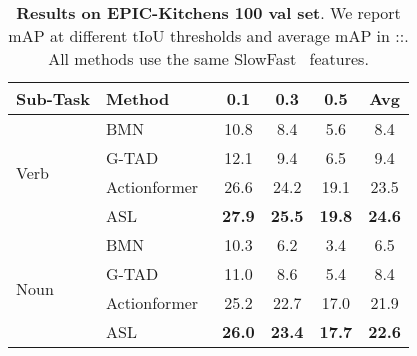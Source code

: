 \documentclass[10pt,twocolumn,letterpaper]{article}
\begin{document}
\begin{table}[t]
    \centering
    \caption{\label{tab:result_epickitchens} \textbf{Results on EPIC-Kitchens 100 val set}. We report mAP at different tIoU thresholds and average mAP in ::. All methods use the same SlowFast~\cite{slowfast,Damen2022RESCALING} features. }
    \vspace{0.5em}
    \small{
	\setlength{\tabcolsep}{2.5pt}
	\begin{tabular}{l|l|cccc}
        \toprule
	{Sub-Task} & {Method} & 0.1 &0.3 &  0.5 & Avg\\
		\hline
	\multirow{4}{*}{Verb} & BMN~\cite{lin2019bmn} & 10.8	&8.4 &5.6&8.4 \\
	& G-TAD~\cite{xu2020gtad} & 12.1 &  9.4 &  6.5 & 9.4\\
	& Actionformer~\cite{zhang2022actionformer} & 26.6 & 24.2  & 19.1 & 23.5 \\
        & ASL & \textbf{27.9} & \textbf{25.5} & \textbf{19.8} & \textbf{24.6} \\
	\hline
	\multirow{4}{*}{Noun} & BMN~\cite{lin2019bmn} & 10.3	&6.2&3.4&6.5 \\
	& G-TAD~\cite{xu2020gtad} & 11.0  & 8.6  & 5.4 & 8.4\\
	& Actionformer~\cite{zhang2022actionformer} & 25.2  & 22.7  & 17.0 & 21.9 \\
        & ASL & \textbf{26.0} & \textbf{23.4} & \textbf{17.7} & \textbf{22.6} \\
        \bottomrule
	\end{tabular}}
\end{table}
\end{document}
